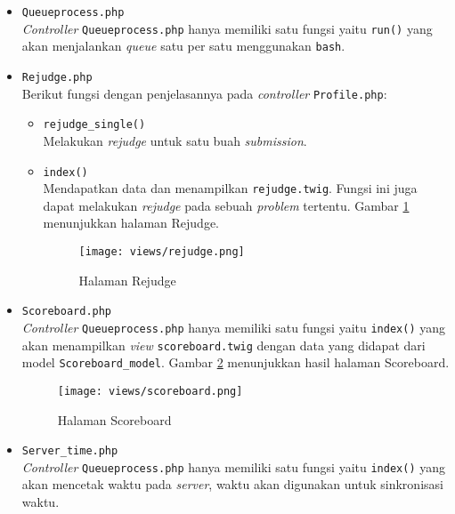 \begin{itemize}
\begin{itemize}
	      \end{itemize}

	\item \verb|Queueprocess.php| \\
	      \textit{Controller} \verb|Queueprocess.php| hanya memiliki satu fungsi yaitu \verb|run()| yang akan menjalankan \textit{queue} satu per satu menggunakan \verb|bash|.

	      \newpage

	\item \verb|Rejudge.php| \\
	      Berikut fungsi dengan penjelasannya pada \textit{controller} \verb|Profile.php|:

	      \begin{itemize}
		      \item \verb|rejudge_single()| \\
		            Melakukan \textit{rejudge} untuk satu buah \textit{submission}.
		      \item \verb|index()| \\
		            Mendapatkan data dan menampilkan \verb|rejudge.twig|. Fungsi ini juga dapat melakukan \textit{rejudge} pada sebuah \textit{problem} tertentu. Gambar \ref{fig:3:1:1:rejudge} menunjukkan halaman Rejudge.

		            \begin{figure}[h]
			            \centering
			            \texttt{[image: views/rejudge.png]}
			            \caption{Halaman Rejudge}
			            \label{fig:3:1:1:rejudge}
		            \end{figure}

	      \end{itemize}

	\item \verb|Scoreboard.php| \\
	      \textit{Controller} \verb|Queueprocess.php| hanya memiliki satu fungsi yaitu \verb|index()| yang akan menampilkan \textit{view} \verb|scoreboard.twig| dengan data yang didapat dari model \verb|Scoreboard_model|. Gambar \ref{fig:3:1:1:scoreboard} menunjukkan hasil halaman Scoreboard.

	      \begin{figure}
		      \centering
		      \texttt{[image: views/scoreboard.png]}
		      \caption{Halaman Scoreboard}
		      \label{fig:3:1:1:scoreboard}
	      \end{figure}

	\item \verb|Server_time.php| \\
	      \textit{Controller} \verb|Queueprocess.php| hanya memiliki satu fungsi yaitu \verb|index()| yang akan mencetak waktu pada \textit{server}, waktu akan digunakan untuk sinkronisasi waktu.


\end{itemize}
